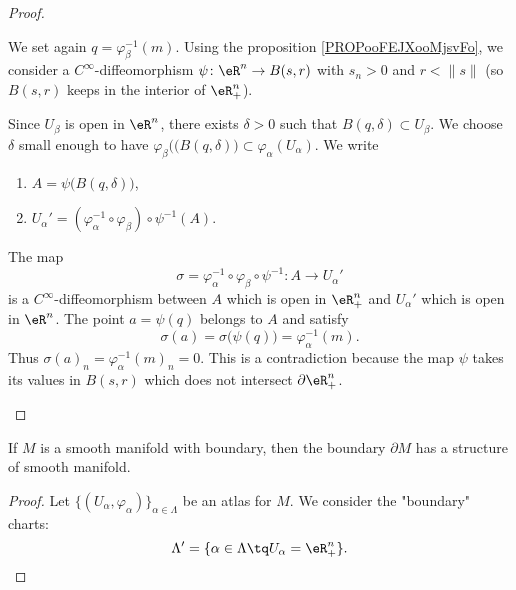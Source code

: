 \begin{proof}
\begin{subproof}
\begin{subproof}
			We set again \( q=\varphi_{\beta}^{-1}(m)\). Using the proposition  \ref{PROPooFEJXooMjsvFo}, we consider a \( C^{\infty}\)-diffeomorphism \(\psi \colon \eR^n\to B(s,r)  \) with \( s_n>0\) and \( r<\| s \|\) (so \( B(s,r)\) keeps in the interior of \( \eR^n_+\)).

			Since \( U_{\beta}\) is open in \( \eR^n\), there exists \( \delta>0\) such that \( B(q,\delta)\subset U_{\beta}\). We choose \( \delta\) small enough to have \( \varphi_{\beta}(\big( B(q,\delta) \big)\subset \varphi_{\alpha}(U_{\alpha})\). We write
			\begin{enumerate}
				\item
				      \( A=\psi\big( B(q,\delta) \big)\),
				\item
				      \( U_{\alpha}'=(\varphi_{\alpha}^{-1}\circ\varphi_{\beta})\circ\psi^{-1}(A)\).
			\end{enumerate}
			The map
			\begin{equation}
				\sigma=\varphi_{\alpha}^{-1}\circ\varphi_{\beta}\circ\psi^{-1} \colon A\to U_{\alpha}'
			\end{equation}
			is a \( C^{\infty}\)-diffeomorphism between \( A\) which is open in \( \eR^n_+\) and \( U_{\alpha}'\) which is open in \( \eR^n\). The point \( a=\psi(q)\) belongs to \( A\) and satisfy
			\begin{equation}
				\sigma(a)=\sigma\big( \psi(q) \big)=\varphi_{\alpha}^{-1}(m).
			\end{equation}
			Thus \( \sigma(a)_n=\varphi_{\alpha}^{-1}(m)_n=0 \). This is a contradiction because the map \( \psi\) takes its values in \( B(s,r)\) which does not intersect \( \partial \eR^n_+\).
		\end{subproof}
	\end{subproof}
\end{proof}

\begin{proposition}	\label{PROPooTENAooDxIAbf}
	If \( M\) is a smooth manifold with boundary, then the boundary \( \partial M\) has a structure of smooth manifold.
\end{proposition}

\begin{proof}
	Let \( \{ (U_{\alpha}, \varphi_{\alpha}) \}_{\alpha\in \Lambda}\) be an atlas for \( M\). We consider the "boundary" charts:
	\begin{equation}
		\Lambda'=\{ \alpha\in\Lambda\tq U_{\alpha}=\eR^n_+ \}.
	\end{equation}
\end{proof}

